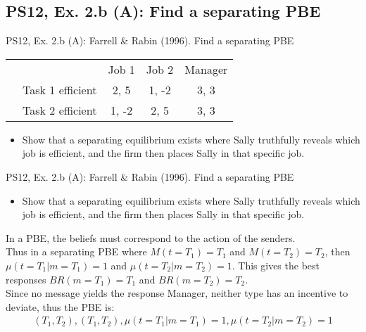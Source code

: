 \subsection{PS12, Ex. 2.b (A): Find a separating PBE}

\begin{frame}{PS12, Ex. 2.b (A): Farrell \& Rabin (1996). Find a separating PBE}
    \begin{table}
      \begin{tabular}{ll|c|c|c|}
          & \multicolumn{1}{c}{} & \multicolumn{1}{c}{Job 1} & \multicolumn{1}{c}{Job 2} & \multicolumn{1}{c}{Manager} \\\cline{3-5}
          \parbox[t]{20mm}{}
           & Task 1 efficient & 2, 5 & 1, -2 & 3, 3 \\
           & Task 2 efficient & 1, -2 & 2, 5 & 3, 3 \\
      \end{tabular}
    \end{table}\vspace{-12pt}
    \begin{itemize}
      \item[(b)] Show that a separating equilibrium exists where Sally truthfully reveals which job is efficient, and the firm then places Sally in that specific job.
    \end{itemize}\vspace{-6pt}
    \begin{multicols}{2}
      \vfill\null\columnbreak
      \vfill\null
    \end{multicols}
\end{frame}

\begin{frame}{PS12, Ex. 2.b (A): Farrell \& Rabin (1996). Find a separating PBE}
    \begin{itemize}
      \item[(b)] Show that a separating equilibrium exists where Sally truthfully reveals which job is efficient, and the firm then places Sally in that specific job.
    \end{itemize}\vspace{-6pt}
    In a PBE, the beliefs must correspond to the action of the senders.\\
    Thus in a separating PBE where $M(t=T_1)=T_1$ and $M(t=T_2)=T_2$, then $\mu(t=T_1|m=T_1)=1$ and $\mu(t=T_2|m=T_2)=1$. This gives the best responses $BR(m=T_1)=T_1$ and $BR(m=T_2)=T_2$.\\
    Since no message yields the response Manager, neither type has an incentive to deviate, thus the PBE is:
    \begin{align*}
        {(T_1,T_2),(T_1,T_2),\mu(t=T_1|m=T_1)=1,\mu(t=T_2|m=T_2)=1}
    \end{align*}
\end{frame}

